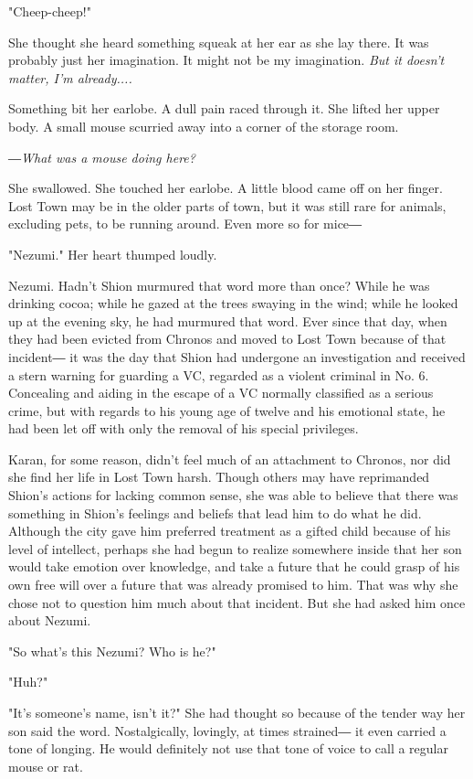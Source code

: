 "Cheep-cheep!"

She thought she heard something squeak at her ear as she lay there. It
was probably just her imagination. It might not be my imagination. \emph{But
it doesn't matter, I'm already....}

Something bit her earlobe. A dull pain raced through it. She lifted her
upper body. A small mouse scurried away into a corner of the storage
room.

\emph{―What was a mouse doing here?}

She swallowed. She touched her earlobe. A little blood came off on her
finger. Lost Town may be in the older parts of town, but it was still
rare for animals, excluding pets, to be running around. Even more so for
mice―

"Nezumi." Her heart thumped loudly.

Nezumi. Hadn't Shion murmured that word more than once? While he was
drinking cocoa; while he gazed at the trees swaying in the wind; while
he looked up at the evening sky, he had murmured that word. Ever since
that day, when they had been evicted from Chronos and moved to Lost Town
because of that incident― it was the day that Shion had undergone an
investigation and received a stern warning for guarding a VC, regarded
as a violent criminal in No. 6. Concealing and aiding in the escape of a
VC normally classified as a serious crime, but with regards to his young
age of twelve and his emotional state, he had been let off with only the
removal of his special privileges.

Karan, for some reason, didn't feel much of an attachment to Chronos,
nor did she find her life in Lost Town harsh. Though others may have
reprimanded Shion's actions for lacking common sense, she was able to
believe that there was something in Shion's feelings and beliefs that
lead him to do what he did. Although the city gave him preferred
treatment as a gifted child because of his level of intellect, perhaps
she had begun to realize somewhere inside that her son would take
emotion over knowledge, and take a future that he could grasp of his own
free will over a future that was already promised to him. That was why
she chose not to question him much about that incident. But she had
asked him once about Nezumi.

"So what's this Nezumi? Who is he?"

"Huh?"

"It's someone's name, isn't it?" She had thought so because of the
tender way her son said the word. Nostalgically, lovingly, at times
strained― it even carried a tone of longing. He would definitely not use
that tone of voice to call a regular mouse or rat.

